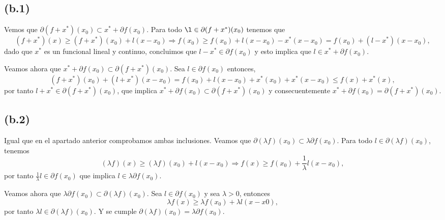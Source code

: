 \subsection*{(b.1)}

Vemos que $\partial (f + x^*)(x_0) \subset x^* + \partial f(x_0)$.
Para todo $\l \in \partial (f + x^*)(x_0)$ tenemos que
\begin{equation*}
    (f + x^*)(x) \geq (f + x^*)(x_0) + l(x - x_0) 
    \Rightarrow f(x_0) \geq f(x_0) + l(x - x_0) - x^*(x - x_0) = f(x_0) + (l - x^*)(x - x_0),
\end{equation*}
dado que $x^*$ es un funcional lineal y continuo,
concluimos que $l - x^* \in \partial f(x_0)$ y esto implica que $l \in x^* + \partial f(x_0)$.

Veamos ahora que $x^* + \partial f(x_0) \subset \partial (f + x^*)(x_0)$.
Sea $l \in \partial f(x_0)$ entonces,
\begin{equation*}
    (f + x^*)(x_0) + (l + x^*)(x - x_0)
        = f(x_0) + l(x - x_0) + x^*(x_0) + x^*(x - x_0)
        \leq f(x) + x^*(x),
\end{equation*}
por tanto $l + x^* \in \partial (f + x^*)(x_0)$,
que implica $x^* + \partial f(x_0) \subset \partial (f + x^*)(x_0)$ y consecuentemente  $x^* + \partial f(x_0) = \partial (f + x^*)(x_0)$.


\subsection*{(b.2)}

Igual que en el apartado anterior comprobamos ambas inclusiones.
Veamos que $\partial (\lambda f)(x_0) \subset \lambda \partial f(x_0)$.
Para todo $l \in \partial (\lambda f)(x_0)$, tenemos
\begin{equation*}
    (\lambda f)(x) \geq (\lambda f)(x_0) + l(x - x_0) 
    \Rightarrow f(x) \geq f(x_0) + \frac{1}{\lambda} l(x - x_0),
\end{equation*}
por tanto $\frac{1}{\lambda} l \in \partial f(x_0)$ que implica $l \in \lambda \partial f(x_0)$.

Veamos ahora que $\lambda \partial f(x_0) \subset \partial (\lambda f)(x_0)$.
Sea $l \in \partial f(x_0)$ y sea $\lambda > 0$, entonces
\begin{equation*}
    \lambda f(x) \geq \lambda f(x_0) + \lambda l(x - x0),
\end{equation*}
por tanto $\lambda l \in \partial (\lambda f)(x_0)$.
Y se cumple $\partial (\lambda f)(x_0) = \lambda \partial f(x_0)$.
